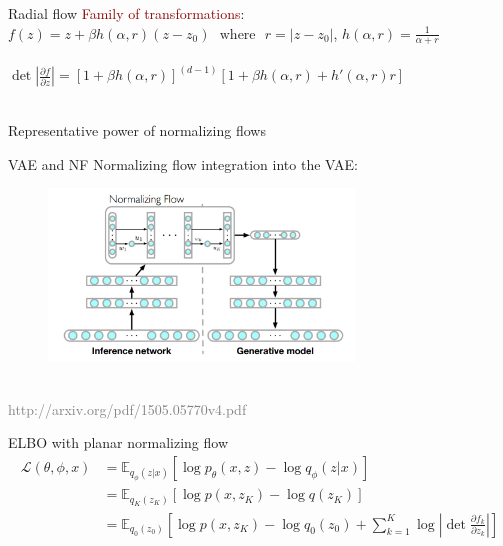 \documentclass[unicode,11pt]{beamer}
\begin{document}
\begin{frame}[fragile]{Radial flow}
  \textcolor{darkred}{Family of transformations}: \\
  $f(z) = z + \beta h(\alpha, r)(z-z_0) ~~~\text{where}~~~ r = \vert z-z_0 \vert$,
  $h(\alpha, r) = \frac{1}{\alpha + r}$\\
  ~\\
  $\det \left\vert \frac{\partial f}{\partial z} \right\vert = [1 + \beta h(\alpha, r)]^{(d-1)}
  [1 + \beta h(\alpha, r) + h'(\alpha, r) r]$\\
  ~\\

\end{frame}

\begin{frame}[fragile]{Representative power of normalizing flows}
\end{frame}



\begin{frame}[fragile]{VAE and NF}
  Normalizing flow integration into the VAE:\\
  \begin{figure}[htbp]
    \includegraphics[height=130pt, keepaspectratio = true]{images/norFlow}
  \end{figure}
  ~\\
  \tiny \textcolor{gray}{http://arxiv.org/pdf/1505.05770v4.pdf}
\end{frame}


\begin{frame}[fragile]{ELBO with planar normalizing flow}
  \begin{align*}
  \mathcal{L}(\theta, \phi, x) &= \mathbb{E}_{q_\phi(z|x)} \left[ \log p_\theta(x, z) - \log q_\phi(z | x) \right] \\
  &= \mathbb{E}_{q_K(z_K)} \left[ \log p(x, z_K) - \log q(z_K) \right] \\
  &= \mathbb{E}_{q_0(z_0)} \left[ \log p(x, z_K) - \log q_0(z_0) + \sum_{k=1}^K \log \left\vert \det
  \frac{\partial f_k}  {\partial z_k} \right\vert \right]
  \end{align*}
\end{frame}
\end{document}
